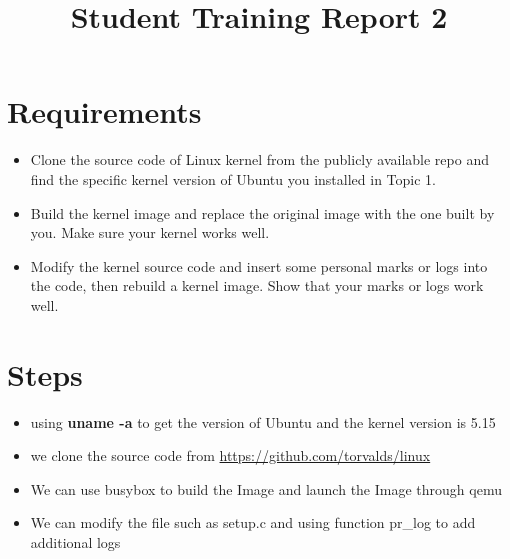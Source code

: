 \documentclass[10pt,journal,compsoc]{IEEEtran}
\begin{document}
\title{Student Training Report 2}

\maketitle
\IEEEdisplaynontitleabstractindextext
\IEEEpeerreviewmaketitle

\section{Requirements}

\begin{itemize}
    \item Clone the source code of Linux kernel from the publicly available repo and find the specific kernel version of Ubuntu you installed in Topic 1.
    \item Build the kernel image and replace the original image with the one built by you. Make sure your kernel works well.
    \item Modify the kernel source code and insert some personal marks or logs into the code, then rebuild a kernel image. Show that your marks or logs work well.
\end{itemize}

\section{Steps}

\begin{itemize}
    \item using \textbf{uname -a} to get the version of Ubuntu and the kernel version is 5.15
    \item we clone the source code from \url{https://github.com/torvalds/linux}
    \item We can use busybox to build the Image and launch the Image through qemu
    \item We can modify the file such as setup.c and using function pr_log to add additional logs
\end{itemize}  
\end{document}
